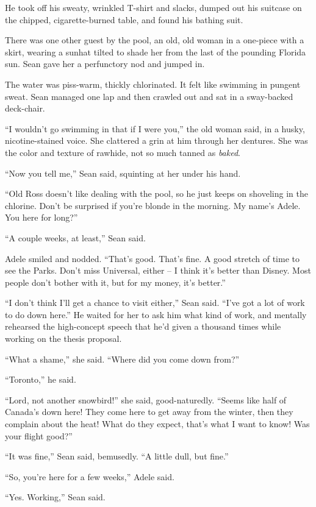 He took off his sweaty, wrinkled T-shirt and slacks, dumped out his 
suitcase on the chipped, cigarette-burned table, and found his bathing 
suit.

There was one other guest by the pool, an old, old woman in a one-piece 
with a skirt, wearing a sunhat tilted to shade her from the last of the 
pounding Florida sun. Sean gave her a perfunctory nod and jumped in.

The water was piss-warm, thickly chlorinated. It felt like swimming in 
pungent sweat. Sean managed one lap and then crawled out and sat in a 
sway-backed deck-chair.

“I wouldn't go swimming in that if I were you,” the old woman said, 
in a husky, nicotine-stained voice. She clattered a grin at him through 
her dentures. She was the color and texture of rawhide, not so much 
tanned as \emph{baked}.

“Now you tell me,” Sean said, squinting at her under his hand.

“Old Ross doesn't like dealing with the pool, so he just keeps on 
shoveling in the chlorine. Don't be surprised if you're blonde in the 
morning. My name's Adele. You here for long?”

“A couple weeks, at least,” Sean said.

Adele smiled and nodded. “That's good. That's fine. A good stretch of 
time to see the Parks. Don't miss Universal, either -- I think it's 
better than Disney. Most people don't bother with it, but for my money, 
it's better.”

“I don't think I'll get a chance to visit either,” Sean said. 
“I've got a lot of work to do down here.” He waited for her to ask 
him what kind of work, and mentally rehearsed the high-concept speech 
that he'd given a thousand times while working on the thesis proposal.

“What a shame,” she said. “Where did you come down from?”

“Toronto,” he said.

“Lord, not another snowbird!” she said, good-naturedly. “Seems 
like half of Canada's down here! They come here to get away from the 
winter, then they complain about the heat! What do they expect, that's 
what I want to know! Was your flight good?”

“It was fine,” Sean said, bemusedly. “A little dull, but fine.”

“So, you're here for a few weeks,” Adele said.

“Yes. Working,” Sean said.


